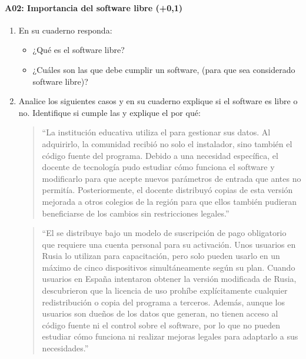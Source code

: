 \documentclass[letterpaper,10pt,spanish]{sphinxmanual}
\begin{document}
\paragraph{A02: Importancia del software libre (+0,1)}
\label{\detokenize{cursos/ofimatica10/periodo01/G02:a02-importancia-del-software-libre-0-1}}
\sphinxAtStartPar
{}
\begin{enumerate}
%
\item {} 
\sphinxAtStartPar
En su cuaderno responda:
\begin{itemize}
\item {} 
\sphinxAtStartPar
¿Qué es el software libre?

\item {} 
\sphinxAtStartPar
¿Cuáles son las  que debe cumplir un software, (para que sea considerado software libre)?

\end{itemize}

\item {} 
\sphinxAtStartPar
Analice los siguientes casos y en su cuaderno explique si el software es libre o no. Identifique si cumple las  y explique el por qué:
\begin{quote}

\sphinxAtStartPar
“La institución educativa utiliza el  para gestionar sus datos. Al adquirirlo, la comunidad recibió no solo el instalador, sino también el código fuente del programa. Debido a una necesidad específica, el docente de tecnología pudo estudiar cómo funciona el software y modificarlo para que acepte nuevos parámetros de entrada que antes no permitía. Posteriormente, el docente distribuyó copias de esta versión mejorada a otros colegios de la región para que ellos también pudieran beneficiarse de los cambios sin restricciones legales.”
\end{quote}
\begin{quote}

\sphinxAtStartPar
“El  se distribuye bajo un modelo de suscripción de pago obligatorio que requiere una cuenta personal para su activación. Unos usuarios en Rusia lo utilizan para capacitación, pero solo pueden usarlo en un máximo de cinco dispositivos simultáneamente según su plan. Cuando usuarios en España intentaron obtener la versión modificada de Rusia, descubrieron que la licencia de uso prohíbe explícitamente cualquier redistribución o copia del programa a terceros. Además, aunque los usuarios son dueños de los datos que generan, no tienen acceso al código fuente ni el control sobre el software, por lo que no pueden estudiar cómo funciona ni realizar mejoras legales para adaptarlo a sus necesidades.”
\end{quote}
\begin{quote}


\end{quote}
\end{enumerate}
\end{document}

